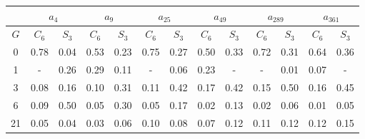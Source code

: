 \begin{table}[h]
   \begin{center}
        \begin{tabular}{c|c|c|c|c|c|c|c|c|c|c|c|c}
            \toprule
            & \multicolumn{2}{c|}{$a_{4}$} & \multicolumn{2}{c|}{$a_{9}$} & \multicolumn{2}{c|}{$a_{25}$} & \multicolumn{2}{c|}{$a_{49}$} & \multicolumn{2}{c|}{$a_{289}$} & \multicolumn{2}{c}{$a_{361}$} \\
            \midrule
            $G$ & $C_{6}$ & $S_{3}$ & $C_{6}$ & $S_{3}$ & $C_{6}$ & $S_{3}$ & $C_{6}$ & $S_{3}$ & $C_{6}$ & $S_{3}$ & $C_{6}$ & $S_{3}$ \\
            \midrule
            0 & 0.78 & 0.04 & 0.53 & 0.23 & 0.75 & 0.27 & 0.50 & 0.33 & 0.72 & 0.31 & 0.64 & 0.36 \\
            1 & - & 0.26 & 0.29 & 0.11 & - & 0.06 & 0.23 & - & - & 0.01 & 0.07 & - \\
            3 & 0.08 & 0.16 & 0.10 & 0.31 & 0.11 & 0.42 & 0.17 & 0.42 & 0.15 & 0.50 & 0.16 & 0.45 \\
            6 & 0.09 & 0.50 & 0.05 & 0.30 & 0.05 & 0.17 & 0.02 & 0.13 & 0.02 & 0.06 & 0.01 & 0.05 \\
            21 & 0.05 & 0.04 & 0.03 & 0.06 & 0.10 & 0.08 & 0.07 & 0.12 & 0.11 & 0.12 & 0.12 & 0.15 \\
            \bottomrule
        \end{tabular}
   \end{center}
\end{table}
